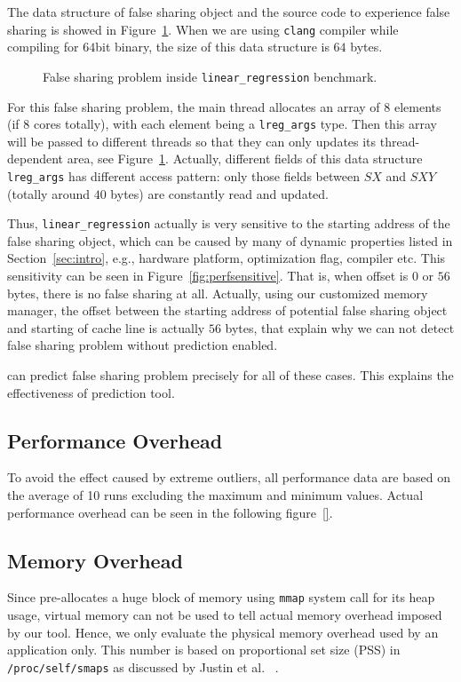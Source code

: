 The data structure of false sharing object and the source code
to experience false sharing is showed in Figure~\ref{fig:linearregression}. 
When we are using \texttt{clang} compiler while compiling for $64$bit binary, the size of this 
data structure is $64$ bytes.

\begin{figure}[!h]
{\centering
\subfigure{}
\caption{False sharing problem inside \texttt{linear\_regression} benchmark.
\label{fig:linearregression}}
}
\end{figure}

For this false sharing problem, the main thread allocates an array of $8$ elements 
(if $8$ cores totally), 
with each element being a \texttt{lreg\_args} type. 
Then this array will be passed to different threads so that they can only updates its 
thread-dependent area, see Figure~\ref{fig:linearregression}.
Actually, different fields of this data structure \texttt{lreg\_args} has different access pattern:
only those fields between $SX$ and $SXY$ (totally around $40$ bytes) are constantly read and updated.

Thus, \texttt{linear\_regression} actually is very sensitive to the starting address 
of the false sharing object, which can be caused by many of dynamic properties 
listed in Section~\ref{sec:intro}, e.g.,
hardware platform, optimization flag, compiler etc.
This sensitivity can be seen in Figure~\ref{fig:perfsensitive}.
That is, when offset is $0$ or $56$ bytes, there is no false sharing at all.
Actually, using our customized memory manager,
the offset between the starting address of potential false sharing object 
and starting of cache line is actually $56$ bytes,
that explain why we can not detect false sharing problem without prediction enabled.

 can predict false sharing problem precisely for all of these cases. This explains
the effectiveness of prediction tool.

\subsection{Performance Overhead}
\label{sec:perfoverhead}
To avoid the effect caused by extreme outliers,
all performance data are based on the average of 10 runs excluding the
maximum and minimum values.
Actual performance overhead can be seen in the following figure~\ref{}. 


\subsection{Memory Overhead}
\label{sec:memoverhead}
Since  pre-allocates a huge block of memory using \texttt{mmap} system call for 
its heap usage, 
virtual memory can not be used to tell actual memory overhead imposed by our tool. 
Hence, we only evaluate the physical memory overhead used by an application only. 
This number is based on proportional set size (PSS) in \texttt{/proc/self/smaps}
as discussed by Justin et al. ~\cite{memusage}. 

